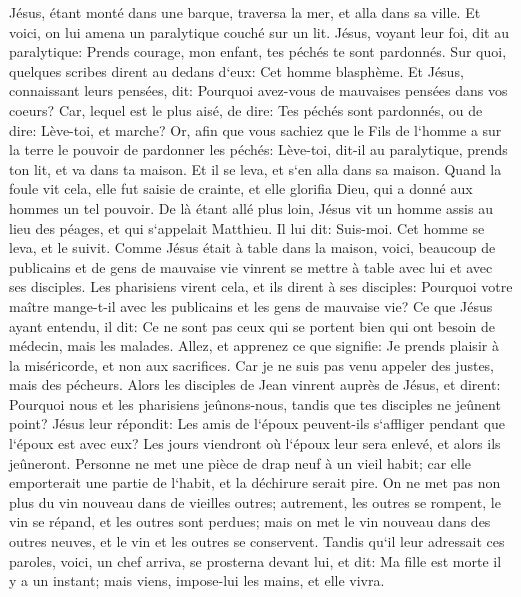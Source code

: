 \verse Jésus, étant monté dans une barque, traversa la mer, et alla dans sa ville. 
\verse Et voici, on lui amena un paralytique couché sur un lit. Jésus, voyant leur foi, dit au paralytique: Prends courage, mon enfant, tes péchés te sont pardonnés. 
\verse Sur quoi, quelques scribes dirent au dedans d`eux: Cet homme blasphème. 
\verse Et Jésus, connaissant leurs pensées, dit: Pourquoi avez-vous de mauvaises pensées dans vos coeurs? 
\verse Car, lequel est le plus aisé, de dire: Tes péchés sont pardonnés, ou de dire: Lève-toi, et marche? 
\verse Or, afin que vous sachiez que le Fils de l`homme a sur la terre le pouvoir de pardonner les péchés: Lève-toi, dit-il au paralytique, prends ton lit, et va dans ta maison. 
\verse Et il se leva, et s`en alla dans sa maison. 
\verse Quand la foule vit cela, elle fut saisie de crainte, et elle glorifia Dieu, qui a donné aux hommes un tel pouvoir. 
\verse De là étant allé plus loin, Jésus vit un homme assis au lieu des péages, et qui s`appelait Matthieu. Il lui dit: Suis-moi. Cet homme se leva, et le suivit. 
\verse Comme Jésus était à table dans la maison, voici, beaucoup de publicains et de gens de mauvaise vie vinrent se mettre à table avec lui et avec ses disciples. 
\verse Les pharisiens virent cela, et ils dirent à ses disciples: Pourquoi votre maître mange-t-il avec les publicains et les gens de mauvaise vie? 
\verse Ce que Jésus ayant entendu, il dit: Ce ne sont pas ceux qui se portent bien qui ont besoin de médecin, mais les malades. 
\verse Allez, et apprenez ce que signifie: Je prends plaisir à la miséricorde, et non aux sacrifices. Car je ne suis pas venu appeler des justes, mais des pécheurs. 
\verse Alors les disciples de Jean vinrent auprès de Jésus, et dirent: Pourquoi nous et les pharisiens jeûnons-nous, tandis que tes disciples ne jeûnent point? 
\verse Jésus leur répondit: Les amis de l`époux peuvent-ils s`affliger pendant que l`époux est avec eux? Les jours viendront où l`époux leur sera enlevé, et alors ils jeûneront. 
\verse Personne ne met une pièce de drap neuf à un vieil habit; car elle emporterait une partie de l`habit, et la déchirure serait pire. 
\verse On ne met pas non plus du vin nouveau dans de vieilles outres; autrement, les outres se rompent, le vin se répand, et les outres sont perdues; mais on met le vin nouveau dans des outres neuves, et le vin et les outres se conservent. 
\verse Tandis qu`il leur adressait ces paroles, voici, un chef arriva, se prosterna devant lui, et dit: Ma fille est morte il y a un instant; mais viens, impose-lui les mains, et elle vivra. 
